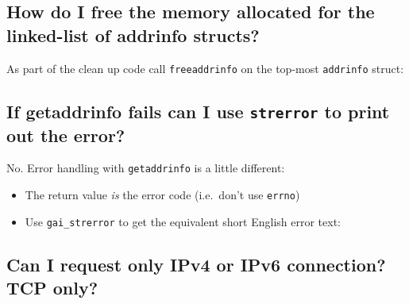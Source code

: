\subsection{How do I free the memory allocated for the linked-list of
addrinfo
structs?}\label{how-do-i-free-the-memory-allocated-for-the-linked-list-of-addrinfo-structs}

As part of the clean up code call \texttt{freeaddrinfo} on the top-most
\texttt{addrinfo} struct:

\begin{Shaded}
\begin{Highlighting}[]
  
\end{Highlighting}
\end{Shaded}

\subsection{\texorpdfstring{If getaddrinfo fails can I use
\texttt{strerror} to print out the
error?}{If getaddrinfo fails can I use strerror to print out the error?}}\label{if-getaddrinfo-fails-can-i-use-strerror-to-print-out-the-error}

No. Error handling with \texttt{getaddrinfo} is a little different:

\begin{itemize}
\itemsep1pt\parskip0pt
\item
  The return value \emph{is} the error code (i.e.~don't use
  \texttt{errno})
\item
  Use \texttt{gai\_strerror} to get the equivalent short English error
  text:
\end{itemize}

\begin{Shaded}
\begin{Highlighting}[]
 
    
\NormalTok{\}}
\end{Highlighting}
\end{Shaded}

\subsection{Can I request only IPv4 or IPv6 connection? TCP
only?}\label{can-i-request-only-ipv4-or-ipv6-connection-tcp-only}

